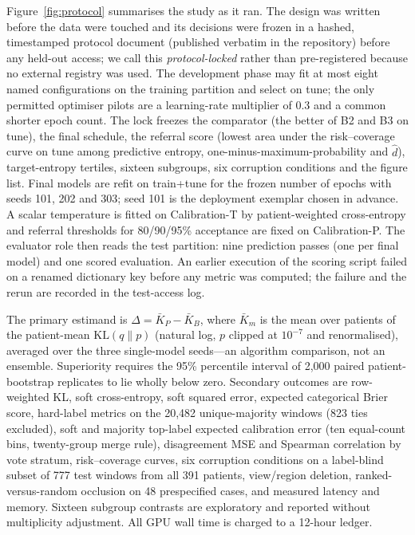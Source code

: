 \documentclass[sigconf,anonymous]{acmart}
\newcommand{\kl}{\mathrm{KL}}
\begin{document}
Figure~\ref{fig:protocol} summarises the study as it ran. The design was written before the data were touched and its decisions were frozen in a hashed, timestamped protocol document (published verbatim in the repository) before any held-out access; we call this \emph{protocol-locked} rather than pre-registered because no external registry was used. The development phase may fit at most eight named configurations on the training partition and select on tune; the only permitted optimiser pilots are a learning-rate multiplier of 0.3 and a common shorter epoch count. The lock freezes the comparator (the better of B2 and B3 on tune), the final schedule, the referral score (lowest area under the risk--coverage curve on tune among predictive entropy, one-minus-maximum-probability and $\hat d$), target-entropy tertiles, sixteen subgroups, six corruption conditions and the figure list. Final models are refit on train+tune for the frozen number of epochs with seeds 101, 202 and 303; seed 101 is the deployment exemplar chosen in advance. A scalar temperature is fitted on Calibration-T by patient-weighted cross-entropy and referral thresholds for 80/90/95\% acceptance are fixed on Calibration-P. The evaluator role then reads the test partition: nine prediction passes (one per final model) and one scored evaluation. An earlier execution of the scoring script failed on a renamed dictionary key before any metric was computed; the failure and the rerun are recorded in the test-access log.

The primary estimand is $\Delta=\bar K_P-\bar K_B$, where $\bar K_m$ is the mean over patients of the patient-mean $\kl(q\|p)$ (natural log, $p$ clipped at $10^{-7}$ and renormalised), averaged over the three single-model seeds---an algorithm comparison, not an ensemble. Superiority requires the 95\% percentile interval of 2,000 paired patient-bootstrap replicates to lie wholly below zero. Secondary outcomes are row-weighted KL, soft cross-entropy, soft squared error, expected categorical Brier score, hard-label metrics on the 20,482 unique-majority windows (823 ties excluded), soft and majority top-label expected calibration error (ten equal-count bins, twenty-group merge rule), disagreement MSE and Spearman correlation by vote stratum, risk--coverage curves, six corruption conditions on a label-blind subset of 777 test windows from all 391 patients, view/region deletion, ranked-versus-random occlusion on 48 prespecified cases, and measured latency and memory. Sixteen subgroup contrasts are exploratory and reported without multiplicity adjustment. All GPU wall time is charged to a 12-hour ledger.
\end{document}
